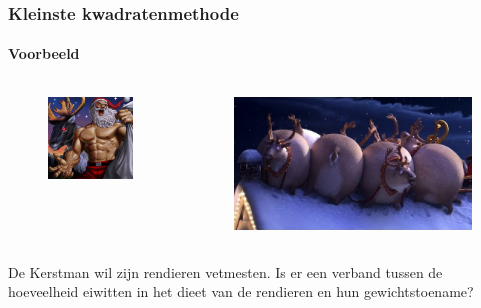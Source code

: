 \documentclass[aspectratio=169]{beamer}
\begin{document}
\begin{frame}
  \frametitle{Kleinste kwadratenmethode}
  \framesubtitle{Voorbeeld}
  \begin{columns}
    \begin{column}{0.5\textwidth}

      \begin{figure}
        \centering
        \includegraphics[width=1.00\textwidth]{img/les3-santa.png}
        \label{fig:les3-santa}
      \end{figure}

    \end{column}
    \begin{column}{0.5\textwidth}

      \begin{figure}
        \centering
        \includegraphics[width=1.00\textwidth]{img/les3-reindeer.jpg}
        \label{fig:les3-reindeer}
      \end{figure}

    \end{column}
  \end{columns}
  De Kerstman wil zijn rendieren vetmesten. Is er een verband
  tussen de hoeveelheid eiwitten in het dieet van de rendieren
  en hun gewichtstoename?

\end{frame}
\end{document}
